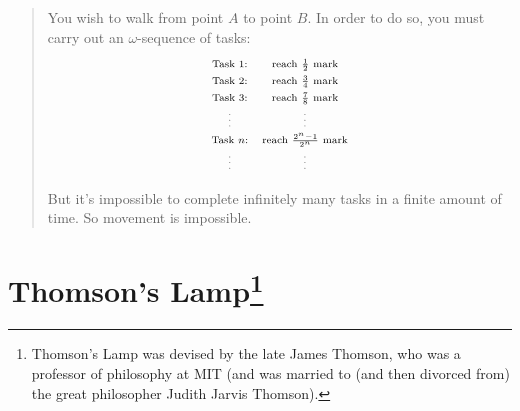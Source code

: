 \documentclass[12pt]{extarticle}
\begin{document}
\begin{quote}
You wish to walk from point $A$ to point $B$. In order to do so, you must carry out an \(\omega\)-sequence of tasks:
\[
\begin{array}{cc}
\text{\scriptsize Task  1:} & \text{\scriptsize reach $\frac{1}{2}$ mark}\\
\text{\scriptsize Task  2:} & \text{\scriptsize reach $\frac{3}{4}$ mark}\\
\text{\scriptsize Task  3:} & \text{\scriptsize reach $\frac{7}{8}$ mark}\\
\text{\tiny\vdots} & \text{\tiny\vdots}\\
\text{\scriptsize Task  $n$:} & \text{\scriptsize reach $\frac{2^n-1}{2^n}$ mark}\\
\text{\tiny\vdots} & \text{\tiny\vdots}\\
\end{array}
\]
\begin{center}
\end{center}
But it's impossible to complete infinitely many tasks in a finite amount of time. So movement is impossible. 
\end{quote}




\section{Thomson's Lamp\footnote{Thomson's Lamp was devised by the late James Thomson, who was a professor of philosophy at MIT (and was married to (and then divorced from) the great philosopher Judith Jarvis Thomson).} {\normalsize {}}}
\end{document}
